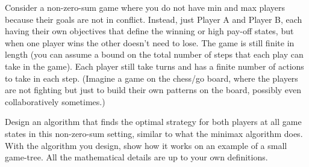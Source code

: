 \documentclass{article}
\begin{document}
\begin{question}[2 Points]
Consider a non-zero-sum game where you do not have min and max players because their goals are not in conflict. Instead, just Player A and Player B, each having their own objectives that define the winning or high pay-off states, but when one player wins the other doesn't need to lose. The game is still finite in length (you can assume a bound on the total number of steps that each play can take in the game). Each player still take turns and has a finite number of actions to take in each step. (Imagine a game on the chess/go board, where the players are not fighting but just to build their own patterns on the board, possibly even collaboratively sometimes.)

Design an algorithm that finds the optimal strategy for both players at all game states in this non-zero-sum setting, similar to what the minimax algorithm does. With the algorithm you design, show how it works on an example of a small game-tree. All the mathematical details are up to your own definitions. 
\end{question}
\end{document}
